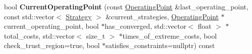 \begin{DoxyCompactItemize}
\item 
bool {\bfseries Current\+Operating\+Point} (const \hyperlink{structilqgames_1_1_operating_point}{Operating\+Point} \&last\+\_\+operating\+\_\+point, const std\+::vector$<$ \hyperlink{structilqgames_1_1_strategy}{Strategy} $>$ \&current\+\_\+strategies, \hyperlink{structilqgames_1_1_operating_point}{Operating\+Point} $\ast$current\+\_\+operating\+\_\+point, bool $\ast$has\+\_\+converged, std\+::vector$<$ float $>$ $\ast$total\+\_\+costs, std\+::vector$<$ size\+\_\+t $>$ $\ast$times\+\_\+of\+\_\+extreme\+\_\+costs, bool check\+\_\+trust\+\_\+region=true, bool $\ast$satisfies\+\_\+constraints=nullptr) const \hypertarget{classilqgames_1_1_game_solver_ad68a9cc3fde07cc2e2b87ded2932dd3a}{}\label{classilqgames_1_1_game_solver_ad68a9cc3fde07cc2e2b87ded2932dd3a}

\end{DoxyCompactItemize}
